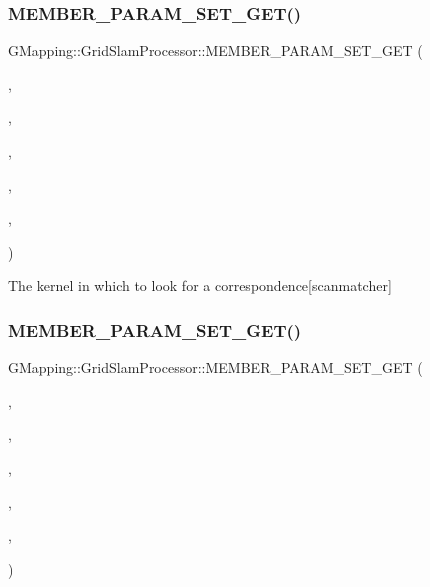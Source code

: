 \subsubsection{\texorpdfstring{M\+E\+M\+B\+E\+R\+\_\+\+P\+A\+R\+A\+M\+\_\+\+S\+E\+T\+\_\+\+G\+E\+T()}{MEMBER\_PARAM\_SET\_GET()}\hspace{0.1cm}{\footnotesize\ttfamily [5/16]}}
{\footnotesize\ttfamily G\+Mapping\+::\+Grid\+Slam\+Processor\+::\+M\+E\+M\+B\+E\+R\+\_\+\+P\+A\+R\+A\+M\+\_\+\+S\+E\+T\+\_\+\+G\+ET (\begin{DoxyParamCaption}\item[{\hyperlink{classGMapping_1_1GridSlamProcessor_ac50952d259590c4aeba22eee4e6437f5}{m\+\_\+matcher}}]{,  }\item[{int}]{,  }\item[{kernel\+Size}]{,  }\item[{protected}]{,  }\item[{public}]{,  }\item[{public}]{ }\end{DoxyParamCaption})}

The kernel in which to look for a correspondence\mbox{[}scanmatcher\mbox{]} \mbox{\label{classGMapping_1_1GridSlamProcessor_a2d7ed8bd432b4e8fd2f415536f48231d}} 
\subsubsection{\texorpdfstring{M\+E\+M\+B\+E\+R\+\_\+\+P\+A\+R\+A\+M\+\_\+\+S\+E\+T\+\_\+\+G\+E\+T()}{MEMBER\_PARAM\_SET\_GET()}\hspace{0.1cm}{\footnotesize\ttfamily [6/16]}}
{\footnotesize\ttfamily G\+Mapping\+::\+Grid\+Slam\+Processor\+::\+M\+E\+M\+B\+E\+R\+\_\+\+P\+A\+R\+A\+M\+\_\+\+S\+E\+T\+\_\+\+G\+ET (\begin{DoxyParamCaption}\item[{\hyperlink{classGMapping_1_1GridSlamProcessor_ac50952d259590c4aeba22eee4e6437f5}{m\+\_\+matcher}}]{,  }\item[{double}]{,  }\item[{opt\+Angular\+Delta}]{,  }\item[{protected}]{,  }\item[{public}]{,  }\item[{public}]{ }\end{DoxyParamCaption})}


